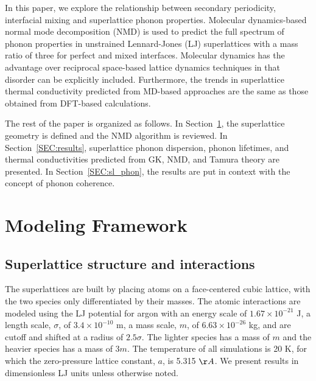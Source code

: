 \documentclass[aps,prb,preprint,preprintnumbers,amsmath,amssymb,floatfix,superscriptaddress]{revtex4}
\begin{document}

In this paper, we explore the relationship between secondary periodicity, interfacial mixing and superlattice phonon properties. Molecular dynamics-based normal mode decomposition (NMD) is used to predict the full spectrum of phonon properties in unstrained Lennard-Jones (LJ) superlattices with a mass ratio of three for perfect and mixed interfaces. Molecular dynamics has the advantage over reciprocal space-based lattice dynamics techniques in that disorder can be explicitly included. Furthermore, the trends in superlattice thermal conductivity predicted from MD-based approaches are the same as those obtained from DFT-based calculations.\cite{PhysRevB.79.075316,PhysRevB.72.174302} 

The rest of the paper is organized as follows. In Section~\ref{SEC:modeling}, the superlattice geometry is defined and the NMD algorithm is reviewed. In Section~\ref{SEC:results}, superlattice phonon dispersion, phonon lifetimes, and thermal conductivities predicted from GK, NMD, and Tamura theory are presented. In Section~\ref{SEC:sl_phon}, the results are put in context with the concept of phonon coherence.


\section{Modeling Framework}\label{SEC:modeling}
\subsection{Superlattice structure and interactions}\label{SEC:sl_struc}
The superlattices are built by placing atoms on a face-centered cubic lattice, with the two species only differentiated by their masses. The atomic interactions are modeled using the LJ potential for argon with an energy scale of $1.67\times10^{-21}$ J, a length scale, $\sigma$, of $3.4\times10^{-10}$ m, a mass scale, $m$, of $6.63\times10^{-26}$ kg, and are cutoff and shifted at a radius of $2.5\sigma$. The lighter species has a mass of $m$ and the heavier species has a mass of $3m$. The temperature of all simulations is 20 K, for which the zero-pressure lattice constant, $a$, is 5.315 $\AA$.\cite{mcgaugheythesis} We present results in  dimensionless LJ units unless otherwise noted. 
\end{document}
